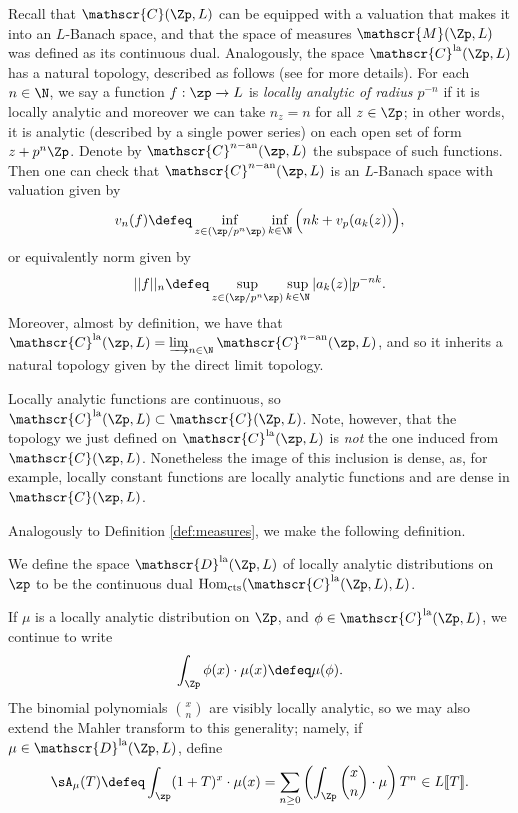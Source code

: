 \documentclass[a4paper,10pt, english, reqno]{smfart}
\newcommand{\lsem}{[\! [}
\newcommand{\rsem}{]\! ]}
\newcommand{\sD}{\mathscr{D}}
\newcommand{\sM}{\mathscr{M}}
\newcommand{\sC}{\mathscr{C}}
\numberwithin{equation}{section}
\begin{document}
Recall that $\sC(\Zp,L)$ can be equipped with a valuation that makes it into  an $L$-Banach space, and that the space of measures $\sM(\Zp,L)$ was defined as its continuous dual. Analogously, the space $\sC^{\mathrm{la}}(\Zp,L)$ has a natural topology, described as follows (see \cite[\S I.4]{Colm10} for more details). For each $n \in \N$, we say a function $f : \zp \to L$ is \emph{locally analytic of radius $p^{-n}$} if it is locally analytic and moreover we can take $n_z = n$ for all $z \in \Zp$; in other words, it is analytic (described by a single power series) on each open set of form $z + p^n\Zp$. Denote by $\mathscr{C}^{n-\mathrm{an}}(\zp, L)$ the subspace of such functions. Then one can check that $\mathscr{C}^{n-\mathrm{an}}(\zp, L)$ is an $L$-Banach space with valuation given by 
\[
    v_n(f) \defeq \inf_{z \in (\zp / p^n \zp)} \inf_{k \in \N} \Big(nk + v_p(a_k(z))\Big),
\]
or equivalently norm given by 
\[
    ||f||_n \defeq \sup_{z \in (\zp / p^n \zp)} \sup_{k \in \N} |a_k(z)| p^{-nk}.
\]
Moreover, almost by definition, we have that $\mathscr{C}^{\mathrm{la}}(\zp, L) = \varinjlim_{n \in \N} \mathscr{C}^{n-\mathrm{an}}(\zp, L)$, and so it inherits a natural topology given by the direct limit topology. 

\begin{remark} 
Locally analytic functions are continuous, so $\sC^{\mathrm{la}}(\Zp,L) \subset \sC(\Zp,L)$. Note, however, that the topology we just defined on $\sC^{\mathrm{la}}(\zp,L)$ is \emph{not} the one induced from $\sC(\zp,L)$. Nonetheless the image of this inclusion is dense, as, for example, locally constant functions are locally analytic functions and are dense in $\mathscr{C}(\zp, L)$. 
\end{remark}

Analogously to Definition \ref{def:measures}, we make the following definition.

\begin{definition}
We define the space  $\sD^{\mathrm{la}}(\Zp,L)$ of locally analytic distributions on $\zp$ to be the continuous dual $\mathrm{Hom}_{\mathrm{cts}}(\sC^{\mathrm{la}}(\Zp,L),L)$.
\end{definition}


If $\mu$ is a locally analytic distribution on $\Zp$, and $\phi \in \sC^{\mathrm{la}}(\Zp,L)$, we continue to write 
\[
    \int_{\Zp} \phi(x) \cdot \mu(x) \defeq \mu(\phi).
\]
The binomial polynomials ${x \choose n}$ are visibly locally analytic, so we may also extend the Mahler transform to this generality; namely, if $\mu \in \sD^{\mathrm{la}}(\Zp,L)$, define
\[
\sA_{\mu}(T) \defeq \int_{\zp}(1+T)^x \cdot \mu(x) = \sum_{n \geq 0} \left(\int_{\Zp}{x \choose n}\cdot \mu\right) T^n \in L\lsem T\rsem.
\]
\end{document}
